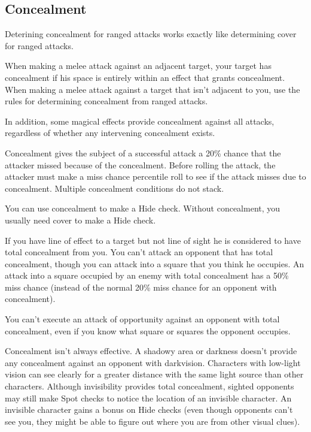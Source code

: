 \subsection{Concealment}
Deterining concealment for ranged attacks works exactly like determining cover for ranged attacks.

When making a melee attack against an adjacent target, your target has concealment if his space is entirely within an effect that grants concealment. When making a melee attack against a target that isn't adjacent to you, use the rules for determining concealment from ranged attacks.

In addition, some magical effects provide concealment against all attacks, regardless of whether any intervening concealment exists.

 Concealment gives the subject of a successful attack a 20\% chance that the attacker missed because of the concealment. Before rolling the attack, the attacker must make a miss chance percentile roll to see if the attack misses due to concealment. Multiple concealment conditions do not stack.

 You can use concealment to make a Hide check. Without concealment, you usually need cover to make a Hide check.

 If you have line of effect to a target but not line of sight he is considered to have total concealment from you. You can't attack an opponent that has total concealment, though you can attack into a square that you think he occupies. An attack into a square occupied by an enemy with total concealment has a 50\% miss chance (instead of the normal 20\% miss chance for an opponent with concealment).

You can't execute an attack of opportunity against an opponent with total concealment, even if you know what square or squares the opponent occupies.

 Concealment isn't always effective. A shadowy area or darkness doesn't provide any concealment against an opponent with darkvision. Characters with low-light vision can see clearly for a greater distance with the same light source than other characters. Although invisibility provides total concealment, sighted opponents may still make Spot checks to notice the location of an invisible character. An invisible character gains a  bonus on Hide checks (even though opponents can't see you, they might be able to figure out where you are from other visual clues).

